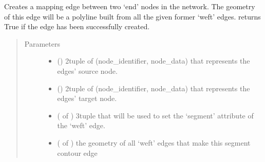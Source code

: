 \documentclass[letterpaper,10pt,english]{sphinxmanual}
\begin{document}
\begin{fulllineitems}

\begin{fulllineitems}
\label{\detokenize{cockatoo:cockatoo.KnitNetworkBase.create_segment_contour_edge}}
Creates a mapping edge between two ‘end’ nodes in the network. The
geometry of this edge will be a polyline built from all the given
former ‘weft’ edges. returns True if the edge has been successfully
created.
\begin{quote}\begin{description}
\item[{Parameters}] \leavevmode\begin{itemize}
\item {} 
 () \textendash{} 2\sphinxhyphen{}tuple of (node\_identifier, node\_data) that represents the edges’
source node.

\item {} 
 () \textendash{} 2\sphinxhyphen{}tuple of (node\_identifier, node\_data) that represents the edges’
target node.

\item {} 
 ( of ) \textendash{} 3\sphinxhyphen{}tuple that will be used to set the ‘segment’ attribute of the
‘weft’ edge.

\item {} 
 ( of ) \textendash{} the geometry of all ‘weft’ edges that make this segment contour
edge

\end{itemize}


\end{description}
\end{quote}
\end{fulllineitems}
\end{fulllineitems}
\end{document}
